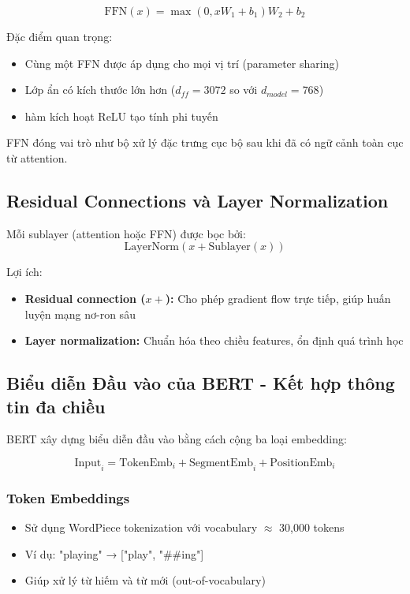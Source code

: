 $$ \text{FFN}(x) = \max(0, xW_1 + b_1)W_2 + b_2 $$

Đặc điểm quan trọng:
\begin{itemize}
    \item Cùng một FFN được áp dụng cho mọi vị trí (parameter sharing)
    \item Lớp ẩn có kích thước lớn hơn ($d_{ff}=3072$ so với $d_{model}=768$)
    \item hàm kích hoạt ReLU tạo tính phi tuyến
\end{itemize}

FFN đóng vai trò như bộ xử lý đặc trưng cục bộ sau khi đã có ngữ cảnh toàn cục từ attention.

\subsection{Residual Connections và Layer Normalization}
\label{ssec:residual_layer_norm}
Mỗi sublayer (attention hoặc FFN) được bọc bởi:
$$ \text{LayerNorm}(x + \text{Sublayer}(x)) $$

Lợi ích:
\begin{itemize}
    \item \textbf{Residual connection ($x +$):} Cho phép gradient flow trực tiếp, giúp huấn luyện mạng nơ-ron sâu
    \item \textbf{Layer normalization:} Chuẩn hóa theo chiều features, ổn định quá trình học
\end{itemize}

\subsection{Biểu diễn Đầu vào của BERT - Kết hợp thông tin đa chiều}
\label{ssec:input_representation_bert}
BERT xây dựng biểu diễn đầu vào bằng cách cộng ba loại embedding:

$$ \text{Input}_i = \text{TokenEmb}_i + \text{SegmentEmb}_i + \text{PositionEmb}_i $$

\subsubsection{Token Embeddings}
\begin{itemize}
    \item Sử dụng WordPiece tokenization với vocabulary $\approx$ 30,000 tokens
    \item Ví dụ: "playing" → ["play", "\#\#ing"]
    \item Giúp xử lý từ hiếm và từ mới (out-of-vocabulary)
\end{itemize}

